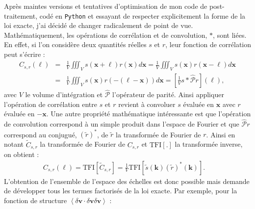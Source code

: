  Après maintes versions et tentatives d'optimisation de mon code de post-traitement, codé en \verb|Python| et essayant de respecter explicitement la forme de la loi exacte, j'ai décidé de changer radicalement de point de vue. 
 Mathématiquement, les opérations de corrélation et de convolution, $*$, sont liées. En effet, si l'on considère deux quantités réelles $s$ et $r$, leur fonction de corrélation peut s'écrire :
 \begin{eqnarray}
      C_{s,r}(\boldsymbol{\ell})  &=& \frac{1}{V}\iiint_V s(\boldsymbol{x} + \boldsymbol{\ell}) r (\boldsymbol{x}) d\boldsymbol{x} =  \frac{1}{V} \iiint_V s(\boldsymbol{x}) r (\boldsymbol{x} - \boldsymbol{\ell}) d\boldsymbol{x} \nonumber\\
      &=&  \frac{1}{V} \iiint_V s(\boldsymbol{x}) r (-(\boldsymbol{\ell}-\boldsymbol{x}) ) d\boldsymbol{x} = \left[ \frac{1}{V} s * \mathcal{\hat{P}}r \right](\boldsymbol{\ell}),
 \end{eqnarray}
 avec $V$ le volume d'intégration et $\mathcal{\hat{P}}$ l'opérateur de parité.
 Ainsi appliquer l'opération de corrélation entre $s$ et $r$ revient à convoluer $s$ évaluée en $\boldsymbol{x}$ avec $r$ évaluée en $-\boldsymbol{x}$.
 Une autre propriété mathématique intéressante est que l'opération de convolution correspond à un simple produit dans l'espace de Fourier et que $\mathcal{\hat{P}}r$ correspond au conjugué, $(\widetilde{r})^*$, de $\widetilde{r}$ la transformée de Fourier de $r$. Ainsi en notant $\widetilde{C}_{s,r}$ la transformée de Fourier de $C_{s,r}$ et $\text{TFI}[.]$ la transformée inverse, on obtient : 
\begin{eqnarray}
    C_{s,r}(\boldsymbol{\ell})  = \text{TFI}[\widetilde{C}_{s,r}] =  \frac{1}{V}\text{TFI}[\widetilde{s} (\boldsymbol{k}) ( \widetilde{r})^*(\boldsymbol{k})]. \quad
\end{eqnarray}
L'obtention de l'ensemble de l'espace des échelles est donc possible mais demande de développer tous les termes factorisés de la loi exacte. Par exemple, pour la fonction de structure $\left<\delta \boldsymbol{v} \cdot \delta \boldsymbol{v} \delta \boldsymbol{v}\right> $ :
